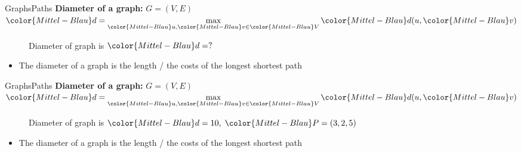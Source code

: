 \begin{frame}{Graphs}{Paths}
  \textbf{Diameter of a graph:}
         {\color{Mittel-Blau}$G = (V , E)$}
  \hfill\begin{math}
    \displaystyle
    {\color{Mittel-Blau}d} =
      \max\limits_{{\color{Mittel-Blau}u}, {\color{Mittel-Blau}v}
        \in {\color{Mittel-Blau}V}}
      {\color{Mittel-Blau}d(u, \color{Mittel-Blau}v)}
  \end{math}
  \begin{figure}
    \begin{adjustbox}{width=0.75\linewidth}
      
    \end{adjustbox}
    \caption{{\color{Mittel-Blau}Diameter} of graph is
      ${\color{Mittel-Blau}d} = ?$}
  \end{figure}
  \vspace{-0.5em}
  \begin{itemize}
    \item<3->
      The {\color{Mittel-Blau}diameter} of a graph is the length / the costs of
      the {\color{Mittel-Blau}longest shortest path}
  \end{itemize}
\end{frame}


\begin{frame}{Graphs}{Paths}
  \textbf{Diameter of a graph:}
         {\color{Mittel-Blau}$G = (V , E)$}
  \hfill\begin{math}
    \displaystyle
    {\color{Mittel-Blau}d} =
      \max\limits_{{\color{Mittel-Blau}u}, {\color{Mittel-Blau}v}
        \in {\color{Mittel-Blau}V}}
      {\color{Mittel-Blau}d(u, \color{Mittel-Blau}v)}
  \end{math}
  \begin{figure}
    \begin{adjustbox}{width=0.75\linewidth}
      
    \end{adjustbox}
    \caption{{\color{Mittel-Blau}Diameter} of graph is
      ${\color{Mittel-Blau}d} = 10, \; {\color{Mittel-Blau}P} = (3,2,5)$}
  \end{figure}
  \vspace{-0.5em}
  \begin{itemize}
    \item
      The {\color{Mittel-Blau}diameter} of a graph is the length / the costs of
      the {\color{Mittel-Blau}longest shortest path}
  \end{itemize}
\end{frame}

